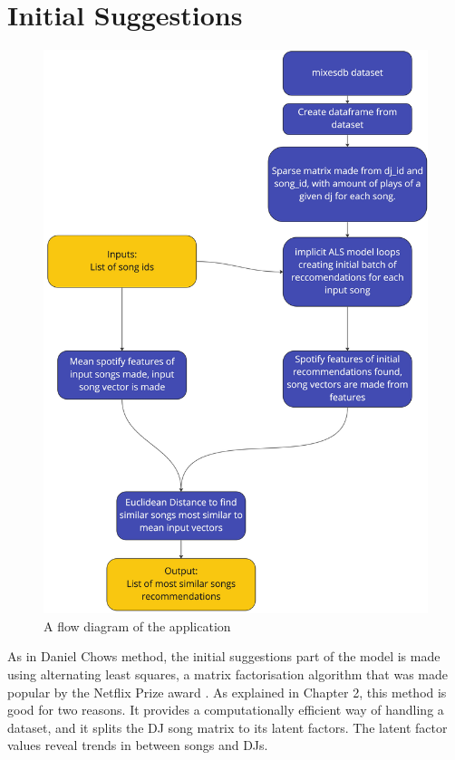 \section{Initial Suggestions}
\begin{figure}[H]{\noindent\ignorespaces}
	\includegraphics[scale=0.09]{images/application_app_flow}
	\centering
	\caption{A flow diagram of the application} 
\end{figure}
As in Daniel Chows method, the initial suggestions part of the model is made using alternating least squares, a matrix factorisation algorithm that was made popular by the Netflix Prize award \citep{zhou_large-scale_2008}. As explained in Chapter 2, this method is good for two reasons. It provides a computationally efficient way of handling a dataset, and it splits the DJ song matrix to its latent factors. The latent factor values reveal trends in between songs and DJs.

